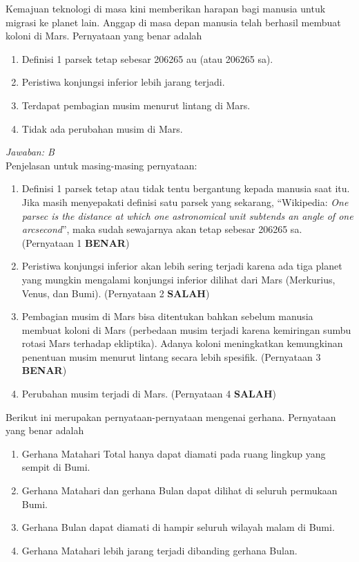 \documentclass[11pt,fleqn, a4paper]{exam}
\begin{document}
\begin{questions}
\question Kemajuan teknologi di masa kini memberikan harapan bagi manusia untuk migrasi ke planet lain. Anggap di masa depan manusia telah berhasil membuat koloni di Mars. Pernyataan yang benar adalah
\begin{enumerate}
\item Definisi 1 parsek tetap sebesar 206265 au (atau 206265 sa).
\item Peristiwa konjungsi inferior lebih jarang terjadi. 
\item Terdapat pembagian musim menurut lintang di Mars.
\item Tidak ada perubahan musim di Mars.
\end{enumerate}

\textit{Jawaban: B}\\
Penjelasan untuk masing-masing pernyataan:
\begin{enumerate}
\item Definisi 1 parsek tetap atau tidak tentu bergantung kepada manusia saat itu. Jika masih menyepakati definisi satu parsek yang sekarang, ``Wikipedia: \textit{One parsec is the distance at which one astronomical unit subtends an angle of one arcsecond}'', maka sudah sewajarnya akan tetap sebesar 206265 sa. (Pernyataan 1 \textbf{BENAR})
\item Peristiwa konjungsi inferior akan lebih sering terjadi karena ada tiga planet yang mungkin mengalami konjungsi inferior dilihat dari Mars (Merkurius, Venus, dan Bumi). (Pernyataan 2 \textbf{SALAH})
\item Pembagian musim di Mars bisa ditentukan bahkan sebelum manusia membuat koloni di Mars (perbedaan musim terjadi karena kemiringan sumbu rotasi Mars terhadap ekliptika). Adanya koloni meningkatkan kemungkinan penentuan musim menurut lintang secara lebih spesifik. (Pernyataan 3 \textbf{BENAR})
\item Perubahan musim terjadi di Mars. (Pernyataan 4 \textbf{SALAH})

\end{enumerate}

\question Berikut ini merupakan pernyataan-pernyataan mengenai gerhana. Pernyataan yang benar adalah
\begin{enumerate}
\item Gerhana Matahari Total hanya dapat diamati pada ruang lingkup yang sempit di Bumi.
\item Gerhana Matahari dan gerhana Bulan dapat dilihat di seluruh permukaan Bumi.
\item Gerhana Bulan dapat diamati di hampir seluruh wilayah malam di Bumi.
\item Gerhana Matahari lebih jarang terjadi dibanding gerhana Bulan.
\end{enumerate}


\end{questions}
\end{document}
